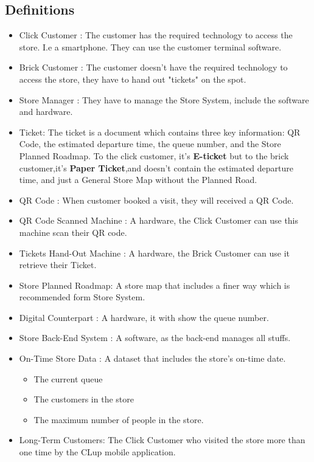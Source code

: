 \documentclass[a4paper,12pt]{report}
\begin{document}
\subsection{Definitions} \label{subsec:definitions}
\begin{itemize}
	\item Click Customer : The customer has the required technology to access the store.
							I.e a smartphone.
							They can use the customer terminal software.
	\item Brick Customer : The customer doesn't have the required technology to access the store, they have to hand out "tickets" on the spot.
	\item Store Manager : They have to manage the Store System, include the software and hardware.
	\item Ticket: The ticket is a document which contains three key information: QR Code, the estimated departure time, the queue number, and the Store Planned Roadmap.
					To the click customer, it's \textbf{E-ticket} but to the brick customer,it's \textbf{Paper Ticket},and doesn't contain the estimated departure time, and just a General Store Map without the Planned Road.
	\item QR Code : When customer booked a visit, they will received a QR Code.
	\item QR Code Scanned Machine : A hardware, the Click Customer can use this machine scan their QR code.
	\item Tickets Hand-Out Machine : A hardware, the Brick Customer can use it retrieve their Ticket.
	\item Store Planned Roadmap: A store map that includes a finer way which is recommended form Store System.
	\item Digital Counterpart : A hardware, it with show the queue number.
	\item Store Back-End System : A software, as the back-end manages all stuffs.
	\item On-Time Store Data : A dataset that includes the store's on-time date.
	\begin{itemize}
		\item The current queue
		\item The customers in the store
		\item The maximum number of people in the store.
	\end{itemize}
	\item Long-Term Customers: The Click Customer who visited the store more than one time by the CLup mobile application.
\end{itemize}
\end{document}

